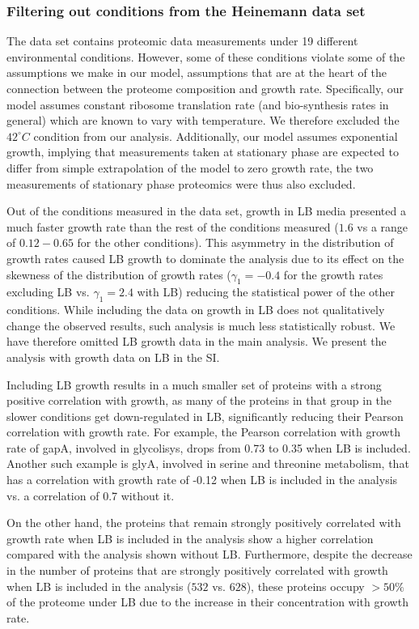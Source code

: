 \subsubsection{Filtering out conditions from the Heinemann data set}
\label{heinemanncond} 

The \cite{Heinemann2015} data set contains proteomic data measurements under 19 different environmental conditions.
However, some of these conditions violate some of the assumptions we make in our model, assumptions that are at the heart of the connection between the proteome composition and growth rate.
Specifically, our model assumes constant ribosome translation rate (and bio-synthesis rates in general) which are known to vary with temperature.
We therefore excluded the $42^\circ C$ condition from our analysis.
Additionally, our model assumes exponential growth, implying that measurements taken at stationary phase are expected to differ from simple extrapolation of the model to zero growth rate, the two measurements of stationary phase proteomics were thus also excluded.

Out of the conditions measured in the \cite{Heinemann2015} data set, growth in LB media presented a much faster growth rate than the rest of the conditions measured ($1.6$ vs a range of $0.12-0.65$ for the other conditions).
This asymmetry in the distribution of growth rates caused LB growth to dominate the analysis due to its effect on the skewness of the distribution of growth rates ($\gamma_1=-0.4$ for the growth rates excluding LB vs. $\gamma_1=2.4$ with LB) reducing the statistical power of the other conditions.
While including the data on growth in LB does not qualitatively change the observed results, such analysis is much less statistically robust.
We have therefore omitted LB growth data in the main analysis.
We present the analysis with growth data on LB in the SI.

Including LB growth results in a much smaller set of proteins with a strong positive correlation with growth, as many of the proteins in that group in the slower conditions get down-regulated in LB, significantly reducing their Pearson correlation with growth rate.
For example, the Pearson correlation with growth rate of gapA, involved in glycolisys, drops from 0.73 to 0.35 when LB is included.
Another such example is glyA, involved in serine and threonine metabolism, that has a correlation with
growth rate of -0.12 when LB is included in the analysis vs. a correlation of 0.7 without it.

On the other hand, the proteins that remain strongly positively correlated with growth rate when LB is included in the analysis show a higher correlation compared with the analysis shown without LB.
Furthermore, despite the decrease in the number of proteins that are strongly positively correlated with growth when LB is included in the analysis ($532$ vs. $628$), these proteins occupy $>50\%$ of the proteome under LB due to the increase in their concentration with growth rate.